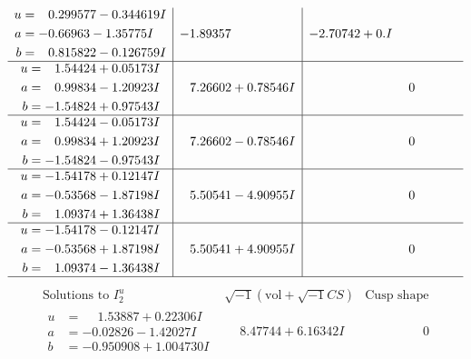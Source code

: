 \documentclass[1p]{elsarticle_modified}
\theoremstyle{definition}
\newcommand{\I}{\sqrt{-1}}
\begin{document}
$$\begin{array}{c|c|c}
\begin{aligned}
u &= \phantom{-}0.299577 - 0.344619 I \\
a &= -0.66963 - 1.35775 I \\
b &= \phantom{-}0.815822 - 0.126759 I\end{aligned}
 & -1.89357\phantom{ +0.000000I} & -2.70742 + 0. I\phantom{ +0.000000I} \\ \hline\begin{aligned}
u &= \phantom{-}1.54424 + 0.05173 I \\
a &= \phantom{-}0.99834 - 1.20923 I \\
b &= -1.54824 + 0.97543 I\end{aligned}
 & \phantom{-}7.26602 + 0.78546 I & \phantom{-0.000000 } 0 \\ \hline\begin{aligned}
u &= \phantom{-}1.54424 - 0.05173 I \\
a &= \phantom{-}0.99834 + 1.20923 I \\
b &= -1.54824 - 0.97543 I\end{aligned}
 & \phantom{-}7.26602 - 0.78546 I & \phantom{-0.000000 } 0 \\ \hline\begin{aligned}
u &= -1.54178 + 0.12147 I \\
a &= -0.53568 - 1.87198 I \\
b &= \phantom{-}1.09374 + 1.36438 I\end{aligned}
 & \phantom{-}5.50541 - 4.90955 I & \phantom{-0.000000 } 0 \\ \hline\begin{aligned}
u &= -1.54178 - 0.12147 I \\
a &= -0.53568 + 1.87198 I \\
b &= \phantom{-}1.09374 - 1.36438 I\end{aligned}
 & \phantom{-}5.50541 + 4.90955 I & \phantom{-0.000000 } 0\\
 \hline 
 \end{array}$$\newpage$$\begin{array}{c|c|c}  
\text{Solutions to }I^u_{2}& \I (\text{vol} + \sqrt{-1}CS) & \text{Cusp shape}\\
 \hline 
\begin{aligned}
u &= \phantom{-}1.53887 + 0.22306 I \\
a &= -0.02826 - 1.42027 I \\
b &= -0.950908 + 1.004730 I\end{aligned}
 & \phantom{-}8.47744 + 6.16342 I & \phantom{-0.000000 } 0 \\ \hline\begin{aligned}

\end{aligned}
\end{array}$$
\end{document}
